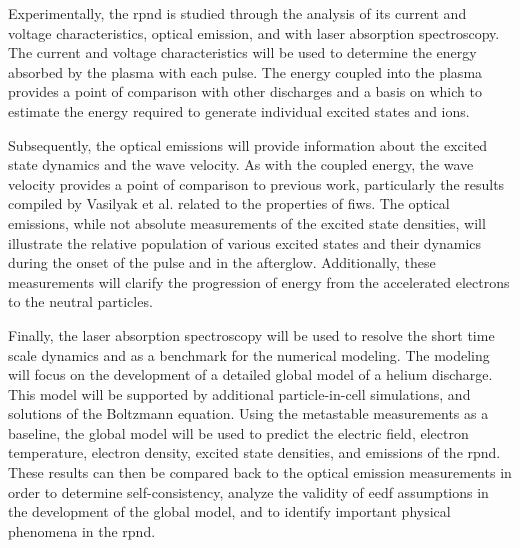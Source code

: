 Experimentally, the \acs{rpnd} is studied through the analysis of its current
and voltage characteristics, optical emission, and with laser absorption
spectroscopy. The current and voltage characteristics will be used to determine
the energy absorbed by the plasma with each pulse. The energy coupled into the
plasma provides a point of comparison with other discharges and a basis on which
to estimate the energy required to generate individual excited states and ions.

Subsequently, the optical emissions will provide information about the excited
state dynamics and the wave velocity. As with the coupled energy, the wave
velocity provides a point of comparison to previous work, particularly the
results compiled by Vasilyak et al. \cite{Vasilyak1994} related to the
properties of \acs{fiw}s. The optical emissions, while not absolute measurements
of the excited state densities, will illustrate the relative population of
various excited states and their dynamics during the onset of the pulse and in
the afterglow. Additionally, these measurements will clarify the progression of
energy from the accelerated electrons to the neutral particles.

Finally, the laser absorption spectroscopy will be used to resolve the short
time scale dynamics and as a benchmark for the numerical modeling. The modeling
will focus on the development of a detailed global model of a helium discharge.
This model will be supported by additional particle-in-cell simulations, and
solutions of the Boltzmann equation. Using the metastable measurements as a
baseline, the global model will be used to predict the electric field, electron
temperature, electron density, excited state densities, and emissions of the
\acs{rpnd}. These results can then be compared back to the optical emission
measurements in order to determine self-consistency, analyze the validity of
\acs{eedf} assumptions in the development of the global model, and to identify
important physical phenomena in the \acs{rpnd}.
